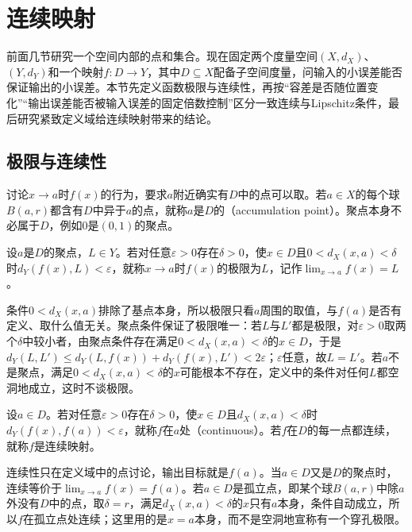 \section{连续映射}
\label{sec:metric-continuous-maps}

前面几节研究一个空间内部的点和集合。现在固定两个度量空间$(X,d_X)$、$(Y,d_Y)$和一个映射$f:D\to Y$，其中$D\subseteq X$配备子空间度量，问输入的小误差能否保证输出的小误差。本节先定义函数极限与连续性，再按“容差是否随位置变化”“输出误差能否被输入误差的固定倍数控制”区分一致连续与Lipschitz条件，最后研究紧致定义域给连续映射带来的结论。

\subsection{极限与连续性}
\label{sec:metric-limits-continuity}

讨论$x\to a$时$f(x)$的行为，要求$a$附近确实有$D$中的点可以取。若$a\in X$的每个球$B(a,r)$都含有$D$中异于$a$的点，就称$a$是$D$的（accumulation point）。聚点本身不必属于$D$，例如$0$是$(0,1)$的聚点。

\begin{definition}[函数极限]
\label{def:metric-function-limit}
设$a$是$D$的聚点，$L\in Y$。若对任意$\varepsilon>0$存在$\delta>0$，使$x\in D$且$0<d_X(x,a)<\delta$时$d_Y(f(x),L)<\varepsilon$，就称$x\to a$时$f(x)$的极限为$L$，记作$\lim_{x\to a}f(x)=L$。
\end{definition}

条件$0<d_X(x,a)$排除了基点本身，所以极限只看$a$周围的取值，与$f(a)$是否有定义、取什么值无关。聚点条件保证了极限唯一：若$L$与$L'$都是极限，对$\varepsilon>0$取两个$\delta$中较小者，由聚点条件存在满足$0<d_X(x,a)<\delta$的$x\in D$，于是$d_Y(L,L')\leq d_Y(L,f(x))+d_Y(f(x),L')<2\varepsilon$；$\varepsilon$任意，故$L=L'$。若$a$不是聚点，满足$0<d_X(x,a)<\delta$的$x$可能根本不存在，定义中的条件对任何$L$都空洞地成立，这时不谈极限。

\begin{definition}[连续映射]
\label{def:metric-continuous}
设$a\in D$。若对任意$\varepsilon>0$存在$\delta>0$，使$x\in D$且$d_X(x,a)<\delta$时$d_Y(f(x),f(a))<\varepsilon$，就称$f$在$a$处（continuous）。若$f$在$D$的每一点都连续，就称$f$是连续映射。
\end{definition}

连续性只在定义域中的点讨论，输出目标就是$f(a)$。当$a\in D$又是$D$的聚点时，连续等价于$\lim_{x\to a}f(x)=f(a)$。若$a\in D$是孤立点，即某个球$B(a,r)$中除$a$外没有$D$中的点，取$\delta=r$，满足$d_X(x,a)<\delta$的$x$只有$a$本身，条件自动成立，所以$f$在孤立点处连续；这里用的是$x=a$本身，而不是空洞地宣称有一个穿孔极限。


